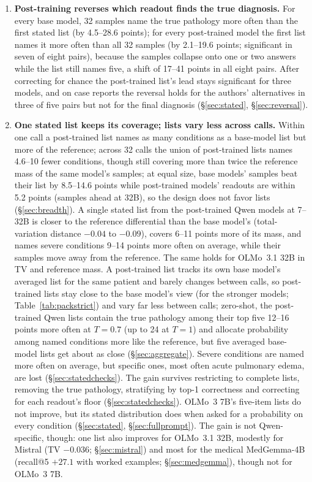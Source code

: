 \documentclass[11pt]{article}
\begin{document}
\begin{enumerate}
\item \textbf{Post-training reverses which readout finds the true diagnosis.} For every base model, 32 samples name the true pathology more often than the first stated list (by 4.5--28.6 points); for every post-trained model the first list names it more often than all 32 samples (by 2.1--19.6 points; significant in seven of eight pairs), because the samples collapse onto one or two answers while the list still names five, a shift of 17--41 points in all eight pairs. After correcting for chance the post-trained list's lead stays significant for three models, and on case reports the reversal holds for the authors' alternatives in three of five pairs but not for the final diagnosis (\S\ref{sec:stated}, \S\ref{sec:reversal}).
\item \textbf{One stated list keeps its coverage; lists vary less across calls.} Within one call a post-trained list names as many conditions as a base-model list but more of the reference; across 32 calls the union of post-trained lists names 4.6--10 fewer conditions, though still covering more than twice the reference mass of the same model's samples; at equal size, base models' samples beat their list by 8.5--14.6 points while post-trained models' readouts are within 5.2 points (samples ahead at 32B), so the design does not favor lists (\S\ref{sec:breadth}). A single stated list from the post-trained Qwen models at 7--32B is closer to the reference differential than the base model's (total-variation distance $-0.04$ to $-0.09$), covers 6--11 points more of its mass, and names severe conditions 9--14 points more often on average, while their samples move away from the reference. The same holds for OLMo~3.1 32B in TV and reference mass. A post-trained list tracks its own base model's averaged list for the same patient and barely changes between calls, so post-trained lists stay close to the base model's view (for the stronger models; Table~\ref{tab:packstrict}) and vary far less between calls; zero-shot, the post-trained Qwen lists contain the true pathology among their top five 12--16 points more often at $T{=}0.7$ (up to 24 at $T{=}1$) and allocate probability among named conditions more like the reference, but five averaged base-model lists get about as close (\S\ref{sec:aggregate}). Severe conditions are named more often on average, but specific ones, most often acute pulmonary edema, are lost (\S\ref{sec:statedchecks}). The gain survives restricting to complete lists, removing the true pathology, stratifying by top-1 correctness and correcting for each readout's floor (\S\ref{sec:statedchecks}). OLMo~3 7B's five-item lists do not improve, but its stated distribution does when asked for a probability on every condition (\S\ref{sec:stated}, \S\ref{sec:fullprompt}). The gain is not Qwen-specific, though: one list also improves for OLMo~3.1 32B, modestly for Mistral (TV $-0.036$; \S\ref{sec:mistral}) and most for the medical MedGemma-4B (recall@5 $+27.1$ with worked examples; \S\ref{sec:medgemma}), though not for OLMo~3 7B.

\end{enumerate}
\end{document}
